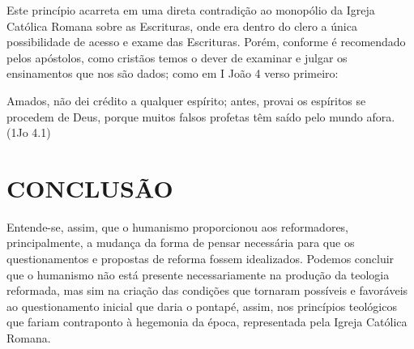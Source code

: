 \documentclass[
    article,            %
	12pt,				%
	oneside,			%
	a4paper,			%
	chapter=TITLE,		%
	section=TITLE,		%
	english,			%
	french,				%
	spanish,			%
	brazil				%
	]{abntex2}
\begin{document}
Este princípio acarreta em uma direta contradição ao monopólio da Igreja Católica Romana sobre as Escrituras, onde era dentro do clero a única possibilidade de acesso e exame das Escrituras. Porém, conforme é recomendado pelos apóstolos, como cristãos temos o dever de examinar e julgar os ensinamentos que nos são dados; como em I João 4 verso primeiro:
\begin{citacao}
Amados, não dei crédito a qualquer espírito; antes, provai os espíritos se procedem de Deus, porque muitos falsos profetas têm saído pelo mundo afora. (1Jo 4.1)
\end{citacao}

\section{CONCLUSÃO}
Entende-se, assim, que o humanismo proporcionou aos reformadores, principalmente, a mudança da forma de pensar necessária para que os questionamentos e propostas de reforma fossem idealizados. Podemos concluir que o humanismo não está presente necessariamente na produção da teologia reformada, mas sim na criação das condições que tornaram possíveis e favoráveis ao questionamento inicial que daria o pontapé, assim, nos princípios teológicos que fariam contraponto à hegemonia da época, representada pela Igreja Católica Romana.
\clearpage

\pagebreak
\renewcommand{\bibname}{{REFER\^ENCIAS}}

\end{document}
